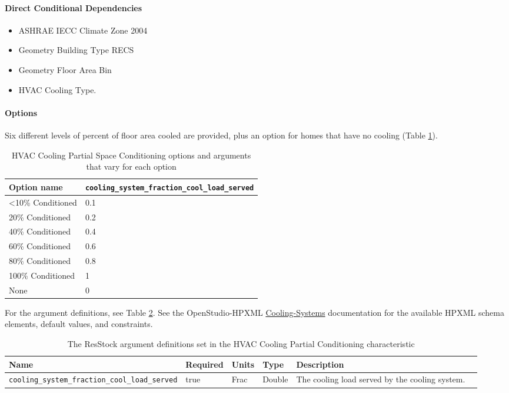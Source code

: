 \paragraph{Direct Conditional Dependencies}
\begin{itemize}
    \item ASHRAE IECC Climate Zone 2004
    \item Geometry Building Type RECS
    \item Geometry Floor Area Bin
    \item HVAC Cooling Type.
\end{itemize}

\paragraph{Options}
Six different levels of percent of floor area cooled are provided, plus an option for homes that have no cooling (Table \ref{table:hc_opt_hvac_cool_par}).

\begin{longtable}[]{|p{3.5cm}|p{3.3cm}|}\caption{HVAC Cooling Partial Space Conditioning options and arguments that vary for each option} \label{table:hc_opt_hvac_cool_par} \\
\toprule\noalign{}
Option name &
\texttt{cooling\_system\_fraction\_cool\_load\_served} \\
\midrule\noalign{}
\endhead
\bottomrule\noalign{}
\endlastfoot
\textless10\% Conditioned & 0.1 \\
20\% Conditioned & 0.2 \\
40\% Conditioned & 0.4 \\
60\% Conditioned & 0.6 \\
80\% Conditioned & 0.8 \\
100\% Conditioned & 1 \\
None & 0 \\
\end{longtable}

For the argument definitions, see Table \ref{table:hc_arg_def_hvac_cool_par}. See the OpenStudio-HPXML \href{https://openstudio-hpxml.readthedocs.io/en/v1.8.1/workflow_inputs.html#hpxml-cooling-systems}{Cooling-Systems} documentation for the available HPXML schema elements, default values, and constraints.

\begin{longtable}[]{|p{3.5cm}|p{1.5cm}|p{1.3cm}|p{1.1cm}|p{}|p{3.3cm}|} \caption{The ResStock argument definitions set in the HVAC Cooling Partial Conditioning characteristic} \label{table:hc_arg_def_hvac_cool_par}\\
\toprule\noalign{}
Name & Required & Units & Type & Description \\
\midrule\noalign{}
\endhead
\bottomrule\noalign{}
\endlastfoot
\texttt{cooling\_system\_fraction\_cool\_load\_served} & true & Frac &
Double &  The cooling load served by the cooling system. \\
\end{longtable}

